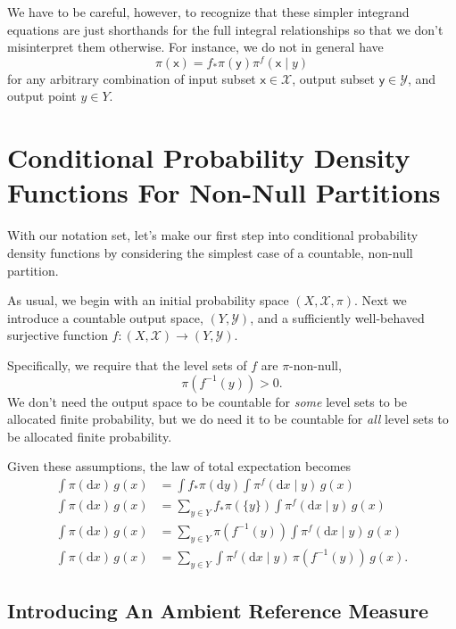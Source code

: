 \documentclass[
  letterpaper,
  DIV=11,
  numbers=noendperiod]{scrartcl}
\begin{document}
We have to be careful, however, to recognize that these simpler
integrand equations are just shorthands for the full integral
relationships so that we don't misinterpret them otherwise. For
instance, we do not in general have \[
\pi( \mathsf{x} )
=
f_{*} \pi (\mathsf{y}) \pi^{f}( \mathsf{x} \mid y )
\] for any arbitrary combination of input subset
\(\mathsf{x} \in \mathcal{X}\), output subset
\(\mathsf{y} \in \mathcal{Y}\), and output point \(y \in Y\).

\section{Conditional Probability Density Functions For Non-Null
Partitions}\label{sec:discrete-conditional-density}

With our notation set, let's make our first step into conditional
probability density functions by considering the simplest case of a
countable, non-null partition.

As usual, we begin with an initial probability space
\((X, \mathcal{X}, \pi)\). Next we introduce a countable output space,
\((Y, \mathcal{Y})\), and a sufficiently well-behaved surjective
function \(f : (X, \mathcal{X}) \rightarrow (Y, \mathcal{Y})\).

Specifically, we require that the level sets of \(f\) are
\(\pi\)-non-null, \[
\pi( f^{-1}(y) ) > 0.
\] We don't need the output space to be countable for \emph{some} level
sets to be allocated finite probability, but we do need it to be
countable for \emph{all} level sets to be allocated finite probability.

Given these assumptions, the law of total expectation becomes
\begin{align*}
\int \pi( \mathrm{d} x ) \, g(x)
&=
\int f_{*} \pi (\mathrm{d} y)
\int \pi^{f}( \mathrm{d} x \mid y ) \, g(x)
\\
\int \pi( \mathrm{d} x ) \, g(x)
&=
\sum_{y \in Y} f_{*} \pi ( \{ y \} )
\int \pi^{f}( \mathrm{d} x \mid y ) \, g(x)
\\
\int \pi( \mathrm{d} x ) \, g(x)
&=
\sum_{y \in Y} \pi ( f^{-1}(y) )
\int \pi^{f}( \mathrm{d} x \mid y ) \, g(x)
\\
\int \pi( \mathrm{d} x ) \, g(x)
&=
\sum_{y \in Y} \int \pi^{f}( \mathrm{d} x \mid y ) \,
\pi ( f^{-1}(y) ) \, g(x).
\end{align*}

\subsection{Introducing An Ambient Reference
Measure}\label{introducing-an-ambient-reference-measure}
\end{document}
